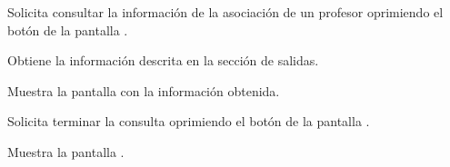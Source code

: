 \begin{UCtrayectoria}
	\UCpaso [\UCactor] Solicita consultar la información de la asociación de un profesor oprimiendo el botón 
	de la pantalla .
	
	\UCpaso [\UCsist] Obtiene la información descrita en la sección de salidas.
	
	\UCpaso [\UCsist] Muestra la pantalla  con la información obtenida.
	
	\UCpaso [\UCactor] Solicita terminar la consulta oprimiendo el botón  de la pantalla .
	
	\UCpaso [\UCsist] Muestra la pantalla .
	
\end{UCtrayectoria}
